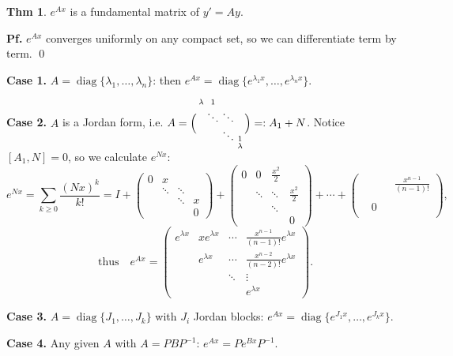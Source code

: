 \documentclass[11pt]{article}
\theoremstyle{definition}
\newtheorem*{theorem}{Thm}
\theoremstyle{remark}
\newcommand{\diag}{\operatorname{diag}}
\begin{document}
\begin{theorem}
$e^{Ax}$ is a fundamental matrix of $y'=Ay$.

\textbf{Pf.} $e^{Ax}$ converges uniformly on any compact set, so we can differentiate term by term. \qed
\end{theorem}

\textbf{Case 1.} $A=\diag\{\lambda_1,\dots,\lambda_n\}$: then
$e^{Ax}=\diag\{e^{\lambda_1 x},\dots,e^{\lambda_n x}\}$.

\textbf{Case 2.} $A$ is a Jordan form, i.e.
$A=\Bigl(\begin{smallmatrix} \lambda & 1 & & \\ & \ddots & \ddots & \\ & & \ddots & 1 \\ & & & \lambda \end{smallmatrix}\Bigr)=:A_1+N$.
Notice $[A_1,N]=0$, so we calculate $e^{Nx}$:
\[
e^{Nx}=\sum_{k\ge0}\frac{(Nx)^k}{k!}
=I+\begin{pmatrix} 0 & x & & \\ & \ddots & \ddots & \\ & & \ddots & x \\ & & & 0 \end{pmatrix}
+\begin{pmatrix} 0 & 0 & \frac{x^2}{2} & \\ & \ddots & \ddots & \frac{x^2}{2} \\ & & \ddots & \\ & & & 0 \end{pmatrix}
+\cdots+
\begin{pmatrix} & & & \frac{x^{n-1}}{(n-1)!} \\ & & & \\ & 0 & & \\ & & & \end{pmatrix},
\]
\[
\text{thus}\quad e^{Ax}=\begin{pmatrix} e^{\lambda x} & xe^{\lambda x} & \cdots & \frac{x^{n-1}}{(n-1)!}e^{\lambda x} \\ & e^{\lambda x} & \cdots & \frac{x^{n-2}}{(n-2)!}e^{\lambda x} \\ & & \ddots & \vdots \\ & & & e^{\lambda x} \end{pmatrix}.
\]

\textbf{Case 3.} $A=\diag\{J_1,\dots,J_k\}$ with $J_i$ Jordan blocks:
$e^{Ax}=\diag\{e^{J_1x},\dots,e^{J_kx}\}$.

\textbf{Case 4.} Any given $A$ with $A = PBP^{-1}$: $e^{Ax} = Pe^{Bx}P^{-1}$.
\end{document}
